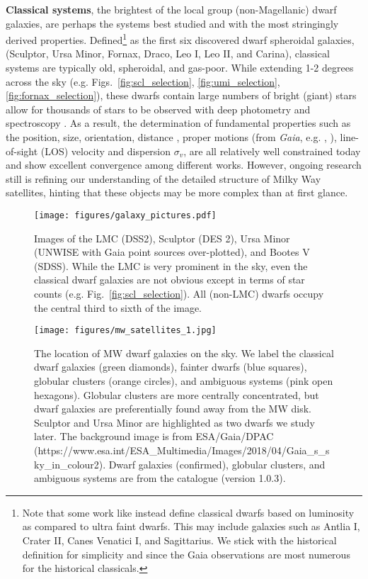 \textbf{Classical systems}, the brightest of the local group
(non-Magellanic) dwarf galaxies, are perhaps the systems best studied
and with the most stringingly derived properties. Defined\footnote{Note
  that some work like \citet{simon2019} instead define classical dwarfs
  based on luminosity as compared to ultra faint dwarfs. This may
  include galaxies such as Antlia I, Crater II, Canes Venatici I, and
  Sagittarius. We stick with the historical definition for simplicity
  and since the Gaia observations are most numerous for the historical
  classicals.} as the first six discovered dwarf spheroidal galaxies,
(Sculptor, Ursa Minor, Fornax, Draco, Leo I, Leo II, and Carina),
classical systems are typically old, spheroidal, and gas-poor. While
extending 1-2 degrees across the sky (e.g.
Figs.~\ref{fig:scl_selection}, \ref{fig:umi_selection}, \ref{fig:fornax_selection}),
these dwarfs contain large numbers of bright (giant) stars allow for
thousands of stars to be observed with deep photometry and spectroscopy
\citep[e.g.][\citet{pace+2020}]{tolstoy+2023}. As a result, the
determination of fundamental properties such as the position, size,
orientation, distance \citep[from 100s of RRL stars,
e.g.][]{tran+2022, garofalo+2025}, proper motions (from \emph{Gaia},
e.g. \citet{battaglia+2022}, \citet{MV2020a}), line-of-sight (LOS)
velocity and dispersion \(\sigma_v\), are all relatively well
constrained today and show excellent convergence among different works.
However, ongoing research still is refining our understanding of the
detailed structure of Milky Way satellites, hinting that these objects
may be more complex than at first glance.

\begin{figure}
\centering
\texttt{[image: figures/galaxy\_pictures.pdf]}
\caption[Dwarf Galaxy Pictures]{Images of the LMC (DSS2), Sculptor (DES
2), Ursa Minor (UNWISE with Gaia point sources over-plotted), and Bootes
V (SDSS). While the LMC is very prominent in the sky, even the classical
dwarf galaxies are not obvious except in terms of star counts (e.g.
Fig.~\ref{fig:scl_selection}). All (non-LMC) dwarfs occupy the central
third to sixth of the image.}\label{fig:galaxy_images}
\end{figure}

\begin{figure}
\centering
\texttt{[image: figures/mw\_satellites\_1.jpg]}
\caption[Dwarf galaxies sky position]{The location of MW dwarf galaxies
on the sky. We label the classical dwarf galaxies (green diamonds),
fainter dwarfs (blue squares), globular clusters (orange circles), and
ambiguous systems (pink open hexagons). Globular clusters are more
centrally concentrated, but dwarf galaxies are preferentially found away
from the MW disk. Sculptor and Ursa Minor are highlighted as two dwarfs
we study later. The background image is from ESA/Gaia/DPAC
(https://www.esa.int/ESA\_Multimedia/Images/2018/04/Gaia\_s\_sky\_in\_colour2).
Dwarf galaxies (confirmed), globular clusters, and ambiguous systems are
from the \citet{pace2024} catalogue (version
1.0.3).}\label{fig:mw_satellite_system}
\end{figure}

